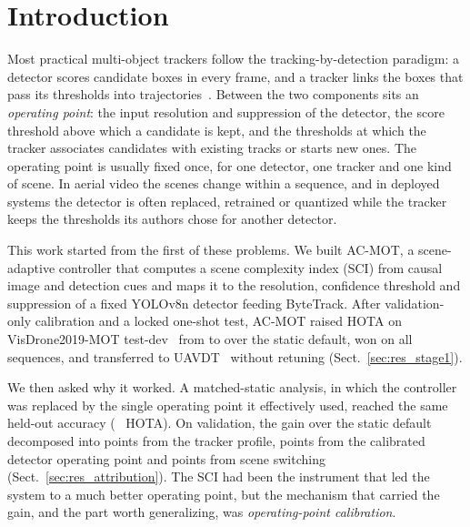 \documentclass[pdflatex,sn-mathphys-num]{sn-jnl}
\newcommand{\Vz}[1]{\V{#1}~\CI{#1}}
\begin{document}

\maketitle

\section{Introduction}\label{sec:intro}
Most practical multi-object trackers follow the tracking-by-detection paradigm: a detector scores candidate boxes in every frame, and a tracker links the boxes that pass its thresholds into trajectories~\cite{bewley2016sort,zhang2022bytetrack,cao2023ocsort}. Between the two components sits an \emph{operating point}: the input resolution and suppression of the detector, the score threshold above which a candidate is kept, and the thresholds at which the tracker associates candidates with existing tracks or starts new ones. The operating point is usually fixed once, for one detector, one tracker and one kind of scene. In aerial video the scenes change within a sequence, and in deployed systems the detector is often replaced, retrained or quantized while the tracker keeps the thresholds its authors chose for another detector.

This work started from the first of these problems. We built AC-MOT, a scene-adaptive controller that computes a scene complexity index (SCI) from causal image and detection cues and maps it to the resolution, confidence threshold and suppression of a fixed YOLOv8n detector feeding ByteTrack. After validation-only calibration and a locked one-shot test, AC-MOT raised HOTA on VisDrone2019-MOT test-dev~\cite{zhu2022visdrone} from  to  over the static default, won on all  sequences, and transferred to UAVDT~\cite{du2018uavdt} without retuning (Sect.~\ref{sec:res_stage1}).

We then asked why it worked. A matched-static analysis, in which the controller was replaced by the single operating point it effectively used, reached the same held-out accuracy (\Vz{ms.dHOTA} HOTA). On validation, the gain over the static default decomposed into  points from the tracker profile,  points from the calibrated detector operating point and  points from scene switching (Sect.~\ref{sec:res_attribution}). The SCI had been the instrument that led the system to a much better operating point, but the mechanism that carried the gain, and the part worth generalizing, was \emph{operating-point calibration}.
\end{document}
